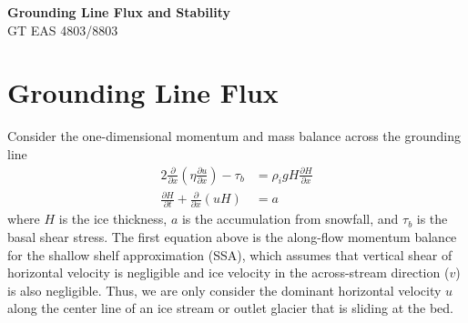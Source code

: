 \documentclass[12pt]{article}
\theoremstyle{definition}
\newcommand{\pd}[2]{\frac{\partial {#1}}{\partial {#2}}}
\begin{document}
\thispagestyle{empty}

\begin{center}
{\LARGE \bf Grounding Line Flux and Stability}\\
{\large GT EAS 4803/8803}\\
\end{center}

\section{Grounding Line Flux}

Consider the one-dimensional momentum and mass balance across the grounding line 
\begin{align}
2 \pd{}{x} \left( \eta \pd{u}{x} \right) - \tau_b &= \rho_i g H \pd{H}{x} \\
\pd{H}{t} + \pd{}{x} \left(u H \right) &= a
\end{align}
where $H$ is the ice thickness, $a$ is the accumulation from snowfall, and $\tau_b$ is the basal shear stress. The first equation above is the along-flow momentum balance for the shallow shelf approximation (SSA), which assumes that vertical shear of horizontal velocity is negligible and ice velocity in the across-stream direction ($v$) is also negligible. Thus, we are only consider the dominant horizontal velocity $u$ along the center line of an ice stream or outlet glacier that is sliding at the bed.
\end{document}
